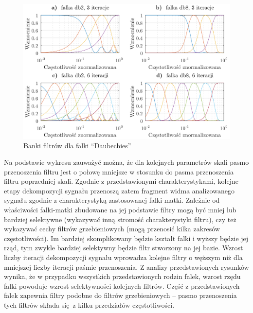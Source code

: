 \begin{figure}[htb!]
\begin{center}
\includegraphics{obrazki/bank_db_demo}
\caption{Banki filtrów dla falki \enquote{Daubechies} \label{fig_demo_db}}
\end{center}
\end{figure}

Na podstawie wykresu zauważyć można, że dla kolejnych parametrów skali pasmo przenoszenia filtru jest o połowę mniejsze w stosunku do pasma przenoszenia filtru poprzedniej skali. Zgodnie z przedstawionymi charakterystykami, kolejne etapy dekompozycji sygnału przenoszą zatem fragment widma analizowanego sygnału zgodnie z charakterystyką zastosowanej falki-matki. Zależnie od właściwości falki-matki zbudowane na jej podstawie filtry mogą być mniej lub bardziej selektywne (wykazywać inną stromość charakterystyki filtru), czy też wykazywać cechy filtrów grzebieniowych (mogą przenosić kilka zakresów częstotliwości). Im bardziej skomplikowany będzie kształt falki i wyższy będzie jej rząd, tym zwykle bardziej selektywny będzie filtr stworzony na jej bazie. Wzrost liczby iteracji dekompozycji sygnału wprowadza kolejne filtry o węższym niż dla mniejszej liczby iteracji paśmie przenoszenia. Z analizy przedstawionych rysunków wynika, że w przypadku wszystkich przedstawionych rodzin falek, wzrost rzędu falki powoduje wzrost selektywności kolejnych filtrów. Część z przedstawionych falek zapewnia filtry podobne do filtrów grzebieniowych -- pasmo przenoszenia tych filtrów składa się z kilku przedziałów częstotliwości.

